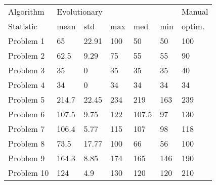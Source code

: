 \begin{tabular}{lllllll}
\toprule
Algorithm & \multicolumn{5}{l}{Evolutionary} & Manual \\
Statistic &         mean &    std &  max &    med &  min & optim. \\
\midrule
Problem 1  &           65 &  22.91 &  100 &     50 &   50 &    100 \\
Problem 2  &         62.5 &   9.29 &   75 &     55 &   55 &     90 \\
Problem 3  &           35 &      0 &   35 &     35 &   35 &     40 \\
Problem 4  &           34 &      0 &   34 &     34 &   34 &     34 \\
Problem 5  &        214.7 &  22.45 &  234 &    219 &  163 &    239 \\
Problem 6  &        107.5 &   9.75 &  122 &  107.5 &   97 &    130 \\
Problem 7  &        106.4 &   5.77 &  115 &    107 &   98 &    118 \\
Problem 8  &         73.5 &  17.77 &  100 &     66 &   56 &    100 \\
Problem 9  &        164.3 &   8.85 &  174 &    165 &  146 &    190 \\
Problem 10 &          124 &    4.9 &  130 &    120 &  120 &    210 \\
\bottomrule
\end{tabular}
